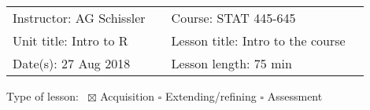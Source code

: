 \documentclass[letterpaper,11pt]{article}
\newcommand\textlcsc[1]{\textsc{\MakeLowercase{#1}}}
\begin{document}

\vspace{5mm}

\begin{tabular}{p{0.4\linewidth} p{0.5\linewidth}}
  Instructor: AG Schissler & Course: STAT 445-645 \\
  Unit title: Intro to R & Lesson title: Intro to the course \\
  Date(s): 27 Aug 2018 & Lesson length: 75 min \\
\end{tabular}

\vspace{5mm}
Type of lesson:~ $\boxtimes$ Acquisition \hspace{5mm} $\square$ Extending/refining  \hspace{5mm} $\square$ Assessment

\vspace{5mm}
\end{document}
